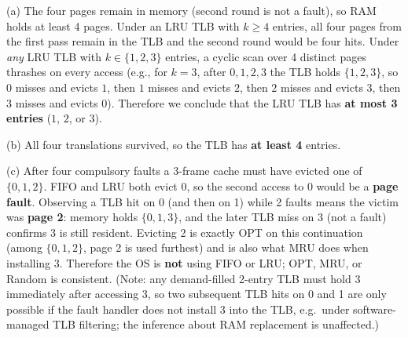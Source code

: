 \documentclass[11pt,a4paper]{article}
\newenvironment{Sol}{%
  \begin{tcolorbox}[sboxstyle, title={Solution}]%
}{%
  \end{tcolorbox}\vspace{0.35em}%
}
\begin{document}
\begin{Sol}
(a) The four pages remain in memory (second round is not a fault), so
RAM holds at least 4 pages. Under an LRU TLB with $k \ge 4$ entries, all
four pages from the first pass remain in the TLB and the second round
would be four hits. Under \emph{any} LRU TLB with $k \in \{1,2,3\}$
entries, a cyclic scan over 4 distinct pages thrashes on every access
(e.g., for $k=3$, after $0,1,2,3$ the TLB holds $\{1,2,3\}$, so $0$
misses and evicts $1$, then $1$ misses and evicts $2$, then $2$ misses
and evicts $3$, then $3$ misses and evicts $0$). Therefore we conclude
that the LRU TLB has \textbf{at most 3 entries} ($1$, $2$, or $3$).

(b) All four translations survived, so the TLB has \textbf{at least 4}
entries.

(c) After four compulsory faults a 3-frame cache must have evicted one of
$\{0,1,2\}$. FIFO and LRU both evict 0, so the second access to 0 would
be a \textbf{page fault}. Observing a TLB hit on 0 (and then on 1) while
2 faults means the victim was \textbf{page 2}: memory holds
$\{0,1,3\}$, and the later TLB miss on 3 (not a fault) confirms 3 is
still resident. Evicting 2 is exactly OPT on this continuation (among
$\{0,1,2\}$, page 2 is used furthest) and is also what MRU does when
installing 3. Therefore the OS is \textbf{not} using FIFO or LRU; OPT,
MRU, or Random is consistent. (Note: any demand-filled 2-entry TLB must
hold 3 immediately after accessing 3, so two subsequent TLB hits on 0
and 1 are only possible if the fault handler does not install 3 into the
TLB, e.g.\ under software-managed TLB filtering; the inference about RAM
replacement is unaffected.)
\end{Sol}
\end{document}
